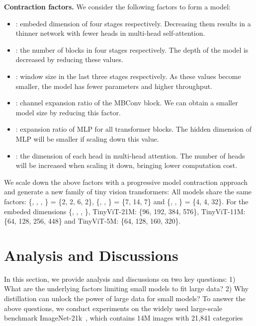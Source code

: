 \documentclass[runningheads]{llncs}
\newcommand\REV[1]{#1}
\newcommand{\IBratio}{}
\newcommand{\IBdepth}{}
\newcommand{\Tdima}{}
\newcommand{\Tdimb}{}
\newcommand{\Tdimc}{}
\newcommand{\Tdimd}{}
\newcommand{\TdimALL}{}
\newcommand{\Tdimh}{}
\newcommand{\mlp}{}
\newcommand{\dtwo}{}
\newcommand{\dthree}{}
\newcommand{\dfour}{}
\newcommand{\dALL}{}
\newcommand{\wstwo}{}
\newcommand{\wsthree}{}
\newcommand{\wsfour}{}
\newcommand{\wsALL}{}
\begin{document}
\textbf{Contraction factors.} 
We consider the following factors to form a model:
\vspace{-1mm}
\begin{itemize}
    \item {\TdimALL}: embeded dimension of four stages respectively. Decreasing them results in a thinner network with fewer heads in multi-head self-attention. \item {\dALL}: the number of blocks in four stages respectively. The depth of the model is decreased by reducing these values.
    \item {\wsALL}: window size in the last three stages respectively. As these values become smaller, the model has fewer parameters and higher throughput.

    \item {\IBratio}: channel expansion ratio of the MBConv block. We can obtain a smaller model size by reducing this factor.
    \item {\mlp}: expansion ratio of MLP for all transformer blocks. The hidden dimension of MLP will be smaller if scaling down this value.
    \item {\Tdimh}: \REV{the dimension of each head in multi-head attention. The number of heads will be increased when scaling it down, bringing lower computation cost. }
\end{itemize}

\REV{We scale down the above factors with a progressive model contraction approach~\cite{x3d} and generate a new family of tiny vision transformers: All models share the same factors: \{\IBdepth, \dtwo, \dthree, \dfour\} = \{2, 2, 6, 2\}, \{\wstwo, \wsthree, \wsfour\} = \{7, 14, 7\} and \{\IBratio, \mlp, \Tdimh\} = \{4, 4, 32\}. For the embeded dimensions \{\Tdima, \Tdimb, \Tdimc, \Tdimd\}, TinyViT-21M: \{96, 192, 384, 576\}, TinyViT-11M: \{64, 128, 256, 448\} and TinyViT-5M: \{64, 128, 160, 320\}.}

\vspace{-3mm}
\section{Analysis and Discussions}
\label{sec:analysis}


In this section, we provide analysis and discussions on two key questions: 1) What are the underlying factors limiting small models to fit large data? 2) Why distillation can unlock the power of large data for small models? 
To answer the above questions, we conduct experiments on the widely used large-scale benchmark ImageNet-21k~\cite{imagenet}, which contains 14M images with 21,841 categories
\end{document}
